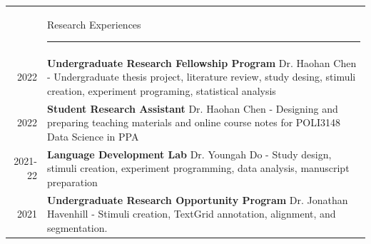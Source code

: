 \documentclass[letterpaper, 11pt]{article}
\newcommand{\headingfont}{\Large\color{black}}
\newenvironment{SectionTable}[1]{
	\renewcommand*{\arraystretch}{1.3}
	\setlength{\tabcolsep}{10pt}
	\begin{longtable}{Rp{6.3in}} & #1 \vspace{0.13cm}\hrule\\[0.6em]}
{\end{longtable}\vspace{-.3cm}}
\begin{document}
\begin{SectionTable}{\headingfont Research Experiences}
2022 &
\textbf{Undergraduate Research Fellowship Program} \hfill Dr. Haohan Chen \newline 
	- Undergraduate thesis project, literature review, study desing, stimuli creation, experiment programing, statistical analysis\\
	2022&
	\textbf{Student Research Assistant} \hfill Dr. Haohan Chen \newline
	- Designing and preparing teaching materials and online course notes for POLI3148 Data Science in PPA\\

	2021-22&
	\textbf{Language Development Lab} \hfill Dr. Youngah Do \newline
	- Study design, stimuli creation, experiment programming, data analysis, manuscript preparation \\


2021 &
\textbf{Undergraduate Research Opportunity Program} \hfill Dr. Jonathan Havenhill\newline
	- Stimuli creation, TextGrid annotation, alignment, and segmentation.\\


	\end{SectionTable}
\end{document}

